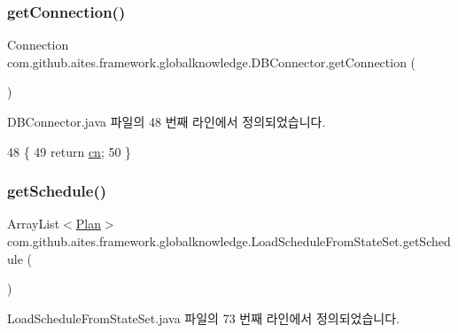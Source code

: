 \subsubsection{\texorpdfstring{get\+Connection()}{getConnection()}}
{\footnotesize\ttfamily Connection com.\+github.\+aites.\+framework.\+globalknowledge.\+D\+B\+Connector.\+get\+Connection (\begin{DoxyParamCaption}{ }\end{DoxyParamCaption})\hspace{0.3cm}{\ttfamily [inherited]}}



D\+B\+Connector.\+java 파일의 48 번째 라인에서 정의되었습니다.


\begin{DoxyCode}
48                                      \{
49         \textcolor{keywordflow}{return} \mbox{\hyperlink{classcom_1_1github_1_1aites_1_1framework_1_1globalknowledge_1_1_d_b_connector_af00c95ca08c2b39cb47ee4286e9f2469}{cn}};
50     \}
\end{DoxyCode}
\mbox{\label{classcom_1_1github_1_1aites_1_1framework_1_1globalknowledge_1_1_load_schedule_from_state_set_a885b9e5c5ec0bc4372454b48851e3f31}} 
\subsubsection{\texorpdfstring{get\+Schedule()}{getSchedule()}}
{\footnotesize\ttfamily Array\+List$<$\mbox{\hyperlink{classcom_1_1github_1_1aites_1_1framework_1_1planner_1_1_plan}{Plan}}$>$ com.\+github.\+aites.\+framework.\+globalknowledge.\+Load\+Schedule\+From\+State\+Set.\+get\+Schedule (\begin{DoxyParamCaption}{ }\end{DoxyParamCaption})}



Load\+Schedule\+From\+State\+Set.\+java 파일의 73 번째 라인에서 정의되었습니다.


